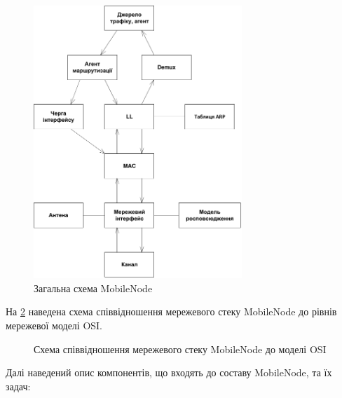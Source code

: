 \documentclass[a4paper,ukrainian,utf8,nocolumnsxix,floatsection,equationsection]{eskdtext}
\begin{document}
\begin{figure}[bth]
	\centering
	\includegraphics[width=0.7\textwidth]{img/mobile_node.pdf}
	\caption{\label{fig:mobile_node}Загальна схема MobileNode}
\end{figure}

На \cref{fig:mobile_node:osi:comparison} наведена схема співвідношення мережевого стеку MobileNode до рівнів мережевої моделі OSI.

\begin{figure}[bth]
	\centering
	\caption{\label{fig:mobile_node:osi:comparison}Схема співвідношення мережевого стеку MobileNode до моделі OSI}
\end{figure}


Далі наведений опис компонентів, що входять до составу MobileNode, та їх задач:
\end{document}
